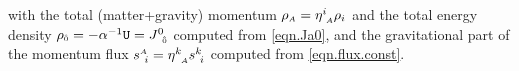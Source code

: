 \documentclass[
10pt, %
a4paper, %
oneside, %
twocolumn,
headinclude,footinclude, %
BCOR5mm, %
]{scrartcl}
\newcommand{\sA}{\mathsmaller A}
\newcommand{\sB}{\mathsmaller B}
\newcommand{\pd}[1]{\partial_{#1}}
\newcommand{\tetrsymbol}{h}
\newcommand{\itetrsymbol}{\eta}
\newcommand{\itetr}[2]{\itetrsymbol^{#1}_{\phantom{#1}#2}}
\newcommand{\tetr}[2]{\tetrsymbol^{#1}_{\phantom{#1}#2}}
\newcommand{\stress}[2]{s_{\ #1}^{#2}}
\newcommand{\detTetr}{\tetrsymbol}
\newcommand{\Dfin}[2]{\mathtt{D}_{\phantom{#2}#1}^{#2}}	%
\newcommand{\Hfin}[2]{\mathtt{H}_{#2#1}}	%
\newcommand{\Efin}[2]{\mathtt{E}^{#1}_{\phantom{#1}#2}}	%
\newcommand{\Ufin}{\mathtt{U}}
\newcommand{\Bfin}[2]{\mathtt{B}^{#1#2}}	%
\newcommand{\w}[2]{W^{#1}_{\phantom{#1}#2}}
\newcommand{\LCsymb}{\bm{\in}}    %
\newcommand{\rhs}[1]{f_{#1}}
\newcommand{\NC}[2]{J^{#2}_{\phantom{#2}#1}}
\newcommand{\indalg}[1]{\hat{\mathsmaller{#1}}}
\newcommand{\shift}[1]{\beta^{#1}}
\begin{document}
	with the total (matter+gravity) momentum $ \rho_{\sA} = \itetr{i}{\sA}\rho_i $ and the total 
	energy density $ \rho_{\indalg{0}} = -\alpha^{-1} \Ufin = \NC{\indalg{0}}{0} $ computed from 
	\eqref{eqn.Ja0}, and the gravitational part of the momentum flux $ \stress{i}{\sA} = 
	\itetr{k}{\sA} \stress{i}{k}$  computed from \eqref{eqn.flux.const}.
	
\end{document}
